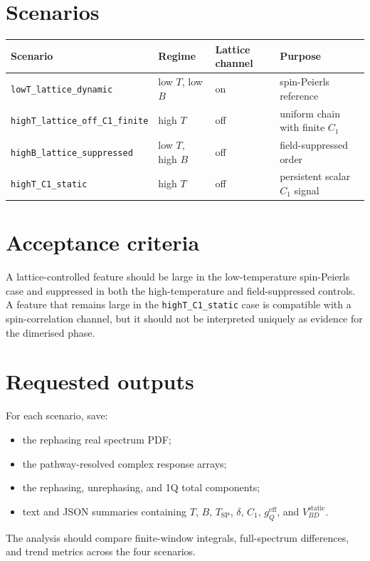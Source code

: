 \documentclass[11pt]{article}
\begin{document}
\section{Scenarios}
\begin{center}
\begin{tabular}{llll}
\toprule
Scenario & Regime & Lattice channel & Purpose \\
\midrule
\texttt{lowT\_lattice\_dynamic} & low $T$, low $B$ & on & spin-Peierls reference \\
\texttt{highT\_lattice\_off\_C1\_finite} & high $T$ & off & uniform chain with finite $C_1$ \\
\texttt{highB\_lattice\_suppressed} & low $T$, high $B$ & off & field-suppressed order \\
\texttt{highT\_C1\_static} & high $T$ & off & persistent scalar $C_1$ signal \\
\bottomrule
\end{tabular}
\end{center}

\section{Acceptance criteria}
A lattice-controlled feature should be large in the low-temperature
spin-Peierls case and suppressed in both the high-temperature and
field-suppressed controls.  A feature that remains large in the
\texttt{highT\_C1\_static} case is compatible with a spin-correlation channel,
but it should not be interpreted uniquely as evidence for the dimerised phase.

\section{Requested outputs}
For each scenario, save:
\begin{itemize}
\item the rephasing real spectrum PDF;
\item the pathway-resolved complex response arrays;
\item the rephasing, unrephasing, and 1Q total components;
\item text and JSON summaries containing $T$, $B$, $T_{\mathrm{SP}}$,
$\delta$, $C_1$, $g_Q^{\mathrm{eff}}$, and $V_{BD}^{\mathrm{static}}$.
\end{itemize}
The analysis should compare finite-window integrals, full-spectrum differences,
and trend metrics across the four scenarios.
\end{document}

